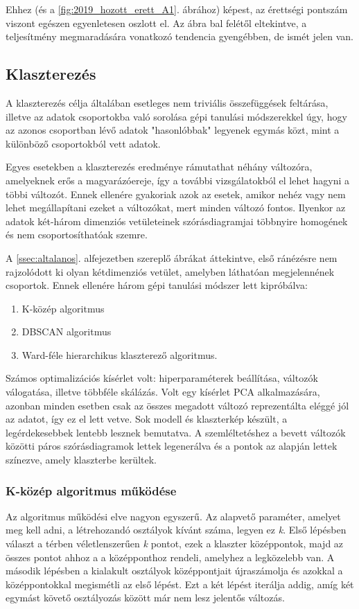 \documentclass[12pt]{article}
\begin{document}
Ehhez (és a \ref{fig:2019_hozott_erett_A1}. ábrához) képest, az érettségi pontszám viszont egészen egyenletesen oszlott el. Az ábra bal felétől eltekintve, a teljesítmény megmaradására vonatkozó tendencia gyengébben, de ismét jelen van.


\subsection{Klaszterezés}

A klaszterezés célja általában esetleges nem triviális összefüggések feltárása, illetve az adatok csoportokba való sorolása gépi tanulási módszerekkel úgy, hogy az azonos csoportban lévő adatok "hasonlóbbak" legyenek egymás közt, mint a különböző csoportokból vett adatok.

Egyes esetekben a klaszterezés eredménye rámutathat néhány változóra, amelyeknek erős a magyarázóereje, így a további vizsgálatokból el lehet hagyni a többi változót. Ennek ellenére gyakoriak azok az esetek, amikor nehéz vagy nem lehet megállapítani ezeket a változókat, mert minden változó fontos. Ilyenkor az adatok két-három dimenziós vetületeinek szórásdiagramjai többnyire homogének és nem csoportosíthatóak szemre.

A \ref{ssec:altalanos}. alfejezetben szereplő ábrákat áttekintve, első ránézésre nem rajzolódott ki olyan kétdimenziós vetület, amelyben láthatóan megjelennének csoportok. Ennek ellenére három gépi tanulási módszer lett kipróbálva:
\begin{enumerate}
\item K-közép algoritmus
\item DBSCAN algoritmus
\item Ward-féle hierarchikus klaszterező algoritmus.
\end{enumerate}

Számos optimalizációs kísérlet volt: hiperparaméterek beállítása, változók válogatása, illetve többféle skálázás. Volt egy kísérlet PCA alkalmazására, azonban minden esetben csak az összes megadott változó reprezentálta eléggé jól az adatot, így ez el lett vetve. Sok modell és klaszterkép készült, a legérdekesebbek lentebb lesznek bemutatva. A szemléltetéshez a bevett változók közötti páros szórásdiagramok lettek legenerálva és a pontok az alapján lettek színezve, amely klaszterbe kerültek.

\subsubsection{K-közép algoritmus működése}
Az algoritmus működési elve nagyon egyszerű. Az alapvető paraméter, amelyet meg kell adni, a létrehozandó osztályok kívánt száma, legyen ez \textit{k}. Első lépésben választ a térben véletlenszerűen \textit{k} pontot, ezek a klaszter középpontok, majd az összes pontot ahhoz a a középponthoz rendeli, amelyhez a legközelebb van. A második lépésben a kialakult osztályok középpontjait újraszámolja és azokkal a középpontokkal megismétli az első lépést. Ezt a két lépést iterálja addig, amíg két egymást követő osztályozás között már nem lesz jelentős változás.
\end{document}

